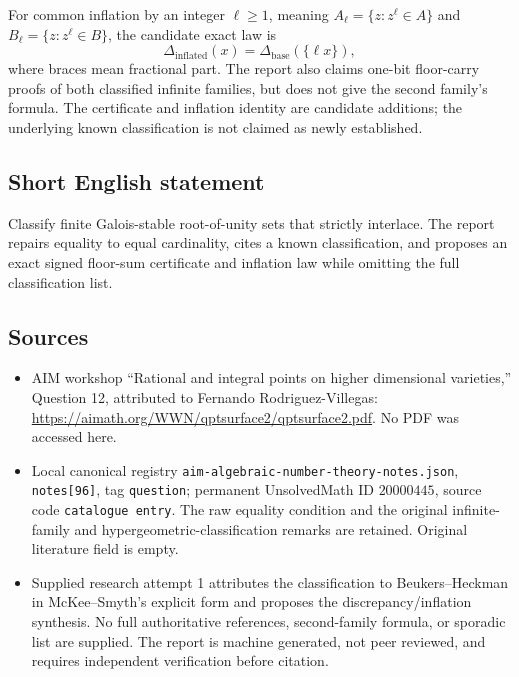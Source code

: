 \documentclass[11pt]{article}
\begin{document}
For common inflation by an integer \(\ell\geq1\), meaning \(A_\ell=\{z:z^\ell\in A\}\) and \(B_\ell=\{z:z^\ell\in B\}\), the candidate exact law is
\[
\Delta_{\mathrm{inflated}}(x)=\Delta_{\mathrm{base}}(\{\ell x\}),
\]
where braces mean fractional part. The report also claims one-bit floor-carry proofs of both classified infinite families, but does not give the second family's formula. The certificate and inflation identity are candidate additions; the underlying known classification is not claimed as newly established.
\subsection{Short English statement}
Classify finite Galois-stable root-of-unity sets that strictly interlace. The report repairs equality to equal cardinality, cites a known classification, and proposes an exact signed floor-sum certificate and inflation law while omitting the full classification list.
\subsection{Sources}
\begin{itemize}
\item AIM workshop ``Rational and integral points on higher dimensional varieties,'' Question 12, attributed to Fernando Rodriguez-Villegas: \url{https://aimath.org/WWN/qptsurface2/qptsurface2.pdf}. No PDF was accessed here.
\item Local canonical registry \texttt{aim-algebraic-number-theory-notes.json}, \texttt{notes[96]}, tag \texttt{question}; permanent UnsolvedMath ID \(20000445\), source code \texttt{catalogue entry}. The raw equality condition and the original infinite-family and hypergeometric-classification remarks are retained. Original literature field is empty.
\item Supplied research attempt 1 attributes the classification to Beukers--Heckman in McKee--Smyth's explicit form and proposes the discrepancy/inflation synthesis. No full authoritative references, second-family formula, or sporadic list are supplied. The report is machine generated, not peer reviewed, and requires independent verification before citation.
\end{itemize}
\end{document}
